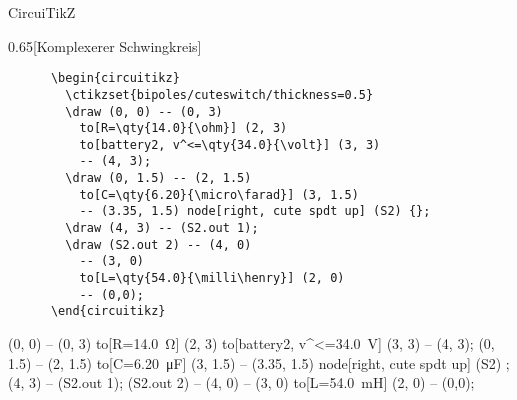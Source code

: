 \begin{frame}[fragile]{CircuiTikZ}
  \begin{CodeExample}{0.65}[Komplexerer Schwingkreis]
    \begin{verbatim}
      \begin{circuitikz}
        \ctikzset{bipoles/cuteswitch/thickness=0.5}
        \draw (0, 0) -- (0, 3)
          to[R=\qty{14.0}{\ohm}] (2, 3)
          to[battery2, v^<=\qty{34.0}{\volt}] (3, 3)
          -- (4, 3);
        \draw (0, 1.5) -- (2, 1.5)
          to[C=\qty{6.20}{\micro\farad}] (3, 1.5)
          -- (3.35, 1.5) node[right, cute spdt up] (S2) {};
        \draw (4, 3) -- (S2.out 1);
        \draw (S2.out 2) -- (4, 0)
          -- (3, 0)
          to[L=\qty{54.0}{\milli\henry}] (2, 0)
          -- (0,0);
      \end{circuitikz}
    \end{verbatim}
  \CodeResult
    \begin{circuitikz}
        \draw (0, 0) -- (0, 3)
          to[R=\qty{14.0}{\ohm}] (2, 3)
          to[battery2, v^<=\qty{34.0}{\volt}] (3, 3)
          -- (4, 3);
        \draw (0, 1.5) -- (2, 1.5)
          to[C=\qty{6.20}{\micro\farad}] (3, 1.5)
          -- (3.35, 1.5) node[right, cute spdt up] (S2) {};
        \draw (4, 3) -- (S2.out 1);
        \draw (S2.out 2) -- (4, 0)
          -- (3, 0)
          to[L=\qty{54.0}{\milli\henry}] (2, 0)
          -- (0,0);
     \end{circuitikz}
  \end{CodeExample}
\end{frame}
